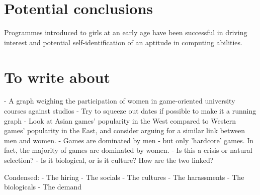 \documentclass{scrartcl}
\begin{document}
\section{Potential conclusions}
Programmes introduced to girls at an early age have been successful in driving interest and potential self-identification of an aptitude in computing abilities.

\section{To write about}
- A graph weighing the participation of women in game-oriented university courses against studios
 - Try to squeeze out dates if possible to make it a running graph
 - Look at Asian games' popularity in the West compared to Western games' popularity in the East, and consider arguing for a similar link between men and women.
 - Games are dominated by men - but only 'hardcore' games. In fact, the majority of games are dominated by women.
 - Is this a crisis or natural selection?
 - Is it biological, or is it culture? How are the two linked?

Condensed:
- The hiring
- The socials
 - The cultures
 - The harassments
- The biologicals
- The demand

 

\end{document}
